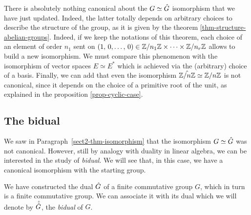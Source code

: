 \begin{rem}
 There is absolutely nothing canonical about the $ G \simeq \hat{G}$ isomorphism that we have just updated. Indeed, the latter totally depends on arbitrary choices to describe the structure of the group, as it is given by the theorem \ref{thm-structure-abelian-groups}. Indeed, if we keep the notations of this theorem, each choice of an element of order $ n_1$ sent on $ (1, \, 0, \ldots, \, 0) \in\mathbb{Z}/n_1 \mathbb{Z} \times \cdots \times \mathbb{Z}/n_r \mathbb{Z}$ allows to build a new isomorphism. We must compare this phenomenon with the isomorphism of vector spaces $ E \simeq E^*$ which is achieved via the (arbitrary) choice of a basis. Finally, we can add that even the isomorphism $\hat{\mathbb{Z}/n\mathbb{Z}} \simeq \mathbb{Z}/n\mathbb{Z}$ is not canonical, since it depends on the choice of a primitive root of the unit, as explained in the proposition \ref{prop-cyclic-case}.
\end{rem}

\subsection{The bidual}
\label{sect2-bidual}

We saw in Paragraph~\ref{sect2-thm-isomorphism} that the isomorphism $ G \simeq \hat{G}$ was not canonical. However, still by analogy with duality in linear algebra, we can be interested in the study of \textit{bidual}. We will see that, in this case, we have a canonical isomorphism with the starting group.

\begin{defn}[Bidual]
 \label{notation-16} We have constructed the dual $\hat{G}$ of a finite commutative group $G$, which in turn is a finite commutative group. We can associate it with its dual which we will denote by $\hat{\hat{G}}$, the \textit{bidual} of $G$.
\end{defn}



